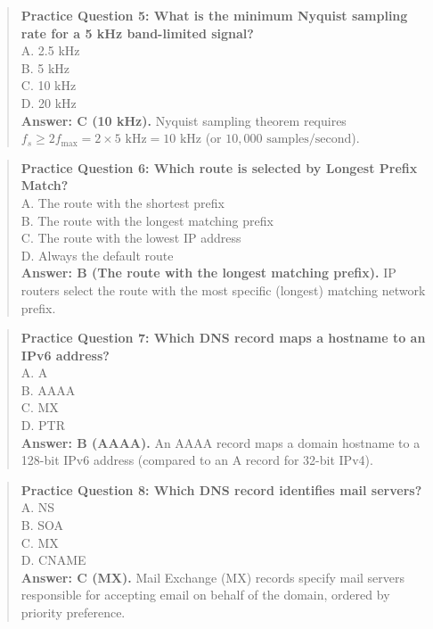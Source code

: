\begin{quote}
\textbf{Practice Question 5: What is the minimum Nyquist sampling rate for a 5 kHz band-limited signal?}\\[4pt]
\quad A. 2.5 kHz\\[2pt]
\quad B. 5 kHz\\[2pt]
\quad C. 10 kHz\\[2pt]
\quad D. 20 kHz\\[2pt]
\vspace{4pt}
\textbf{Answer: C (10 kHz).} Nyquist sampling theorem requires $f_s \ge 2 f_{\max} = 2 \times 5\text{ kHz} = 10\text{ kHz}$ (or $10,000\text{ samples/second}$).
\end{quote}
\begin{quote}
\textbf{Practice Question 6: Which route is selected by Longest Prefix Match?}\\[4pt]
\quad A. The route with the shortest prefix\\[2pt]
\quad B. The route with the longest matching prefix\\[2pt]
\quad C. The route with the lowest IP address\\[2pt]
\quad D. Always the default route\\[2pt]
\vspace{4pt}
\textbf{Answer: B (The route with the longest matching prefix).} IP routers select the route with the most specific (longest) matching network prefix.
\end{quote}
\begin{quote}
\textbf{Practice Question 7: Which DNS record maps a hostname to an IPv6 address?}\\[4pt]
\quad A. A\\[2pt]
\quad B. AAAA\\[2pt]
\quad C. MX\\[2pt]
\quad D. PTR\\[2pt]
\vspace{4pt}
\textbf{Answer: B (AAAA).} An AAAA record maps a domain hostname to a 128-bit IPv6 address (compared to an A record for 32-bit IPv4).
\end{quote}
\begin{quote}
\textbf{Practice Question 8: Which DNS record identifies mail servers?}\\[4pt]
\quad A. NS\\[2pt]
\quad B. SOA\\[2pt]
\quad C. MX\\[2pt]
\quad D. CNAME\\[2pt]
\vspace{4pt}
\textbf{Answer: C (MX).} Mail Exchange (MX) records specify mail servers responsible for accepting email on behalf of the domain, ordered by priority preference.
\end{quote}
